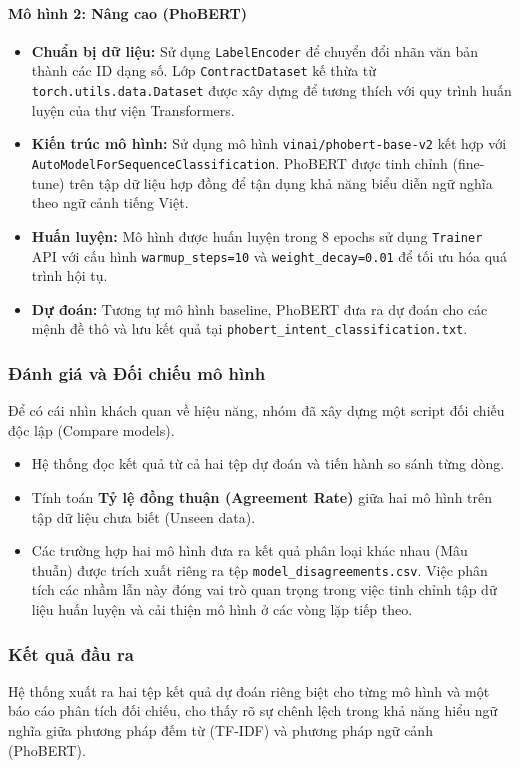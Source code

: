 \paragraph{Mô hình 2: Nâng cao (PhoBERT)}
\begin{itemize}
    \item \textbf{Chuẩn bị dữ liệu:} Sử dụng \texttt{LabelEncoder} để chuyển đổi nhãn văn bản thành các ID dạng số. Lớp \texttt{ContractDataset} kế thừa từ \texttt{torch.utils.data.Dataset} được xây dựng để tương thích với quy trình huấn luyện của thư viện Transformers.
    \item \textbf{Kiến trúc mô hình:} Sử dụng mô hình \texttt{vinai/phobert-base-v2} kết hợp với \texttt{AutoModelForSequenceClassification}. PhoBERT được tinh chỉnh (fine-tune) trên tập dữ liệu hợp đồng để tận dụng khả năng biểu diễn ngữ nghĩa theo ngữ cảnh tiếng Việt.
    \item \textbf{Huấn luyện:} Mô hình được huấn luyện trong 8 epochs sử dụng \texttt{Trainer} API với cấu hình \texttt{warmup\_steps=10} và \texttt{weight\_decay=0.01} để tối ưu hóa quá trình hội tụ.
    \item \textbf{Dự đoán:} Tương tự mô hình baseline, PhoBERT đưa ra dự đoán cho các mệnh đề thô và lưu kết quả tại \texttt{phobert\_intent\_classification.txt}.
\end{itemize}

\subsubsection{Đánh giá và Đối chiếu mô hình}
Để có cái nhìn khách quan về hiệu năng, nhóm đã xây dựng một script đối chiếu độc lập (Compare models).
\begin{itemize}
    \item Hệ thống đọc kết quả từ cả hai tệp dự đoán và tiến hành so sánh từng dòng.
    \item Tính toán \textbf{Tỷ lệ đồng thuận (Agreement Rate)} giữa hai mô hình trên tập dữ liệu chưa biết (Unseen data).
    \item Các trường hợp hai mô hình đưa ra kết quả phân loại khác nhau (Mâu thuẫn) được trích xuất riêng ra tệp \texttt{model\_disagreements.csv}. Việc phân tích các nhầm lẫn này đóng vai trò quan trọng trong việc tinh chỉnh tập dữ liệu huấn luyện và cải thiện mô hình ở các vòng lặp tiếp theo.
\end{itemize}

\subsubsection{Kết quả đầu ra}
Hệ thống xuất ra hai tệp kết quả dự đoán riêng biệt cho từng mô hình và một báo cáo phân tích đối chiếu, cho thấy rõ sự chênh lệch trong khả năng hiểu ngữ nghĩa giữa phương pháp đếm từ (TF-IDF) và phương pháp ngữ cảnh (PhoBERT).